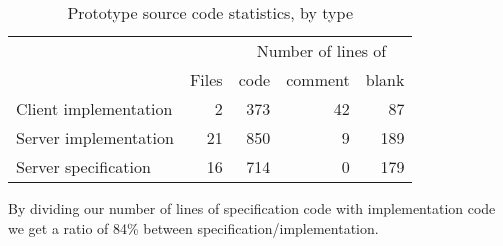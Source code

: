 \begin{table}[h]
  \begin{tabular}{lrrrr}

    &
    &
    \multicolumn{3}{c}{Number of lines of} \\

    &
    \multicolumn{1}{c}{Files} &
    \multicolumn{1}{c}{code} &
    \multicolumn{1}{c}{comment} &
    \multicolumn{1}{c}{blank} \\

    \cmidrule(lr){2-2}
    \cmidrule(lr){3-5}

    Client implementation &
    2 &
    373 &
    42 &
    87 \\

    Server implementation &
    21 &
    850 &
    9 &
    189 \\

    Server specification &
    16 &
    714 &
    0 &
    179 \\

  \end{tabular}
  \caption[Prototype Source Code Statistics]{%
    Prototype source code statistics, by type}
  \label{table:prototype.source.code.stats}
\end{table}

By dividing our number of lines of specification code with implementation code
we get a ratio of 84\% between specification/implementation.
